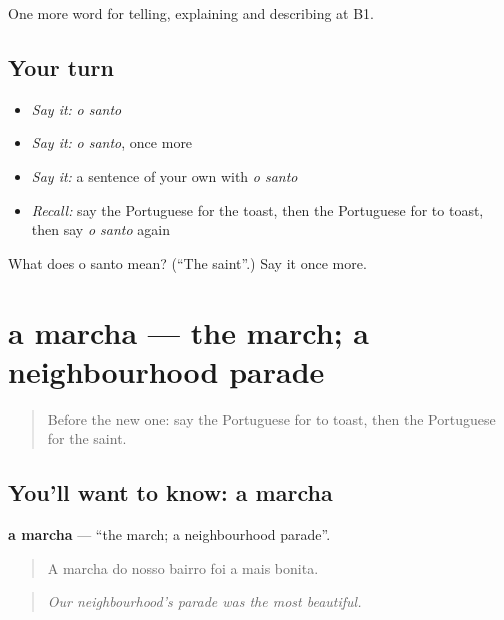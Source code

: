\begin{grammarlens}[title={What you've built}]
One more word for telling, explaining and describing at B1.
\end{grammarlens}

\subsection*{Your turn}
\begin{itemize}
\raggedright
  \item \emph{Say it:} \emph{o santo}
  \item \emph{Say it:} \emph{o santo}, once more
  \item \emph{Say it:} a sentence of your own with \emph{o santo}
  \item \emph{Recall:} say the Portuguese for the toast, then the Portuguese for to toast, then say \emph{o santo} again
\end{itemize}

\begin{tcolorbox}[breakable,colback=teal!4,colframe=teal!35!black,title={Before you move on}]
What does o santo mean? (\textquotedblleft{}The saint\textquotedblright{}.) Say it once more.
\end{tcolorbox}
\section[a marcha]{a marcha — the march; a neighbourhood parade}

\label{lesson:PT-C319-marcha}



\begin{quote}
Before the new one: say the Portuguese for to toast, then the Portuguese for the saint.
\end{quote}

\subsection*{You'll want to know: a marcha}
\textbf{a marcha} — \textquotedblleft{}the march; a neighbourhood parade\textquotedblright{}.

\begin{quote}
A marcha do nosso bairro foi a mais bonita.
\end{quote}

\begin{quote}
\emph{Our neighbourhood’s parade was the most beautiful.}
\end{quote}

